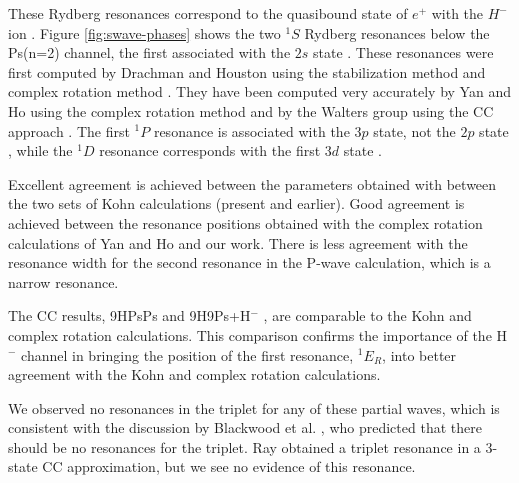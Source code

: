 \documentclass[preprint,showpacs,preprintnumbers,amsmath,amssymb]{revtex4}
\begin{document}
These Rydberg resonances correspond to the quasibound state of $e^+$ with the $H^-$ ion \cite{Drachman1979}.
Figure \ref{fig:swave-phases} shows the two $^1S$ Rydberg resonances below the
Ps(n=2) channel, the first associated with the $2s$ state \cite{DiRienzi2002b}.
These resonances were first computed by Drachman and Houston using the stabilization
method and complex rotation method \cite{Drachman1975}. They have been computed very accurately by Yan and Ho
using the complex rotation method \cite{Yan1999} and by the Walters group using the CC approach \cite{Walters2004}. The first $^1P$ resonance is associated with the $3p$ state, not the $2p$ state \cite{DiRienzi2002b}, while the $^1D$ resonance corresponds with the first $3d$ state \cite{DiRienzi2002a}.

Excellent agreement is achieved between the parameters obtained with between the two sets of Kohn calculations (present and earlier). Good agreement is achieved between the resonance positions obtained with the complex rotation calculations of Yan and Ho \cite{Yan1999,Yan1998a,Ho1998,Ho2000} and our work. There is less agreement with the resonance width for the second resonance in the P-wave calculation, which is a narrow resonance. 

The CC results, 9HPsPs \cite{Blackwood2002} and 9H9Ps+H$^-$ \cite{Walters2004}, are comparable to the Kohn and complex rotation calculations. This comparison confirms the importance of the H$^-$ channel in bringing the position of the first resonance, $^1E_R$, into better agreement with the Kohn and complex rotation calculations.

We observed no resonances in the triplet for any of these partial waves, which is consistent with the discussion by Blackwood et al. \cite{Blackwood2002}, who predicted that there should be no resonances for the triplet. Ray \cite{Ray2006} obtained a triplet resonance in a 3-state CC approximation, but we see no evidence of this resonance.
\end{document}
